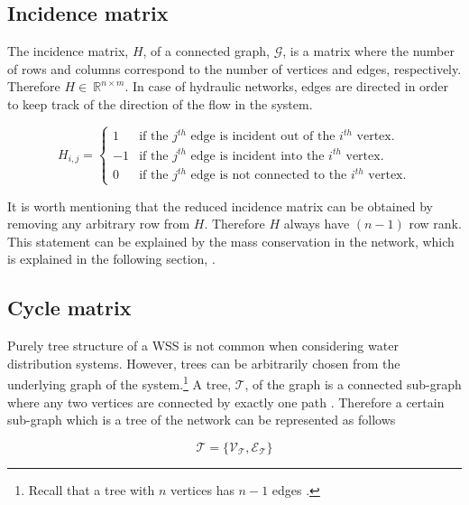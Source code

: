 \subsection{Incidence matrix}
\label{incidence_matrix}

The incidence matrix, $H$, of a connected graph, $\mathcal{G}$, is a matrix where the number of rows and columns correspond to the number of vertices and edges, respectively. Therefore $H\in \: \mathbb{R}^{n \times m}$. In case of hydraulic networks, edges are directed in order to keep track of the direction of the flow in the system. 

\begin{equation}
\label{DiGraph}
 H_{i,j} =
		\left\{
		\begin{array}{ll}
		
		1 			&      \text{if the $j^{th}$ edge is incident out of the $i^{th}$ vertex}.	
\\
	    -1          &      \text{if the $j^{th}$ edge is incident into the $i^{th}$ vertex}.
\\
        0           &      \text{if the $j^{th}$ edge is not connected to the $i^{th}$ vertex}.

		\end{array}
		\right.
\end{equation}	

It is worth mentioning that the reduced incidence matrix can be obtained by removing any arbitrary row from $H$. Therefore $H$ always have $(n-1)$ row rank. This statement can be explained by the mass conservation in the network, which is explained in the following section, .

\subsection{Cycle matrix}
\label{cycle_matrix}

Purely tree structure of a WSS is not common when considering water distribution systems. However, trees can be arbitrarily chosen from the underlying graph of the system.\footnote{Recall that a tree with $n$ vertices has $n-1$ edges \cite{deo2017graph}.}  A tree, $\mathcal{T} $, of the graph is a connected sub-graph where any two vertices are connected by exactly one path \cite{deo2017graph}. Therefore a certain sub-graph which is a tree of the network can be represented as follows

\begin{equation}
  \label{Numberofchords}
  \mathcal{T} = \{\mathcal{V_{\mathcal{T}}}, \mathcal{E_{\mathcal{T}}} \} 
\end{equation}

